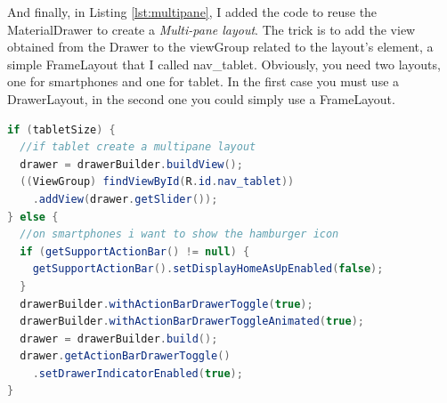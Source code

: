 And finally, in Listing \ref{lst:multipane}, I added the code to reuse the \textsf{MaterialDrawer} to create a \emph{Multi-pane layout}. The trick is to add the view obtained from the \textsf{Drawer} to the \textsf{viewGroup} related to the layout's element, a simple \textsf{FrameLayout} that I called \textsf{nav\_tablet}. Obviously, you need two layouts, one for smartphones and one for tablet. In the first case you must use a \textsf{DrawerLayout}, in the second one you could simply use a \textsf{FrameLayout}.


\begin{lstlisting}[caption={Reuse Drawer for Multi-pane layout},label=lst:multipane, language=Java]
if (tabletSize) {
  //if tablet create a multipane layout
  drawer = drawerBuilder.buildView();
  ((ViewGroup) findViewById(R.id.nav_tablet))
    .addView(drawer.getSlider());
} else {
  //on smartphones i want to show the hamburger icon
  if (getSupportActionBar() != null) {
    getSupportActionBar().setDisplayHomeAsUpEnabled(false);
  }
  drawerBuilder.withActionBarDrawerToggle(true);
  drawerBuilder.withActionBarDrawerToggleAnimated(true);
  drawer = drawerBuilder.build();
  drawer.getActionBarDrawerToggle()
    .setDrawerIndicatorEnabled(true);
}
\end{lstlisting}


